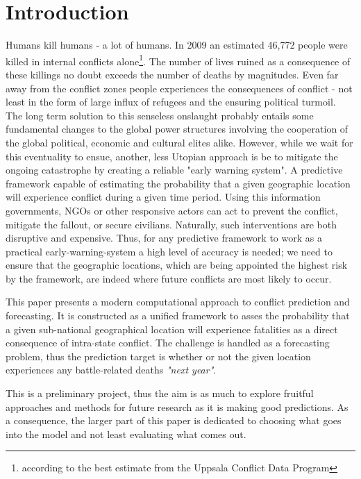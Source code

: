 \documentclass[a4paper]{article}
\begin{document}
\section{Introduction}

Humans kill humans - a lot of humans. In 2009 an estimated 46,772 people were killed in internal conflicts alone\footnote{according to the best estimate from the Uppsala Conflict Data Program}. The number of lives ruined as a consequence of these killings no doubt exceeds the number of deaths by magnitudes. Even far away from the conflict zones people experiences the consequences of conflict - not least in the form of large influx of refugees and the ensuring political turmoil. The long term solution to this senseless onslaught probably entails some fundamental changes to the global power structures involving the cooperation of the global political, economic and cultural elites alike. However, while we wait for this eventuality to ensue, another, less Utopian approach is be to mitigate the ongoing catastrophe by creating a reliable "early warning system". A predictive framework capable of estimating the probability that a given geographic location will experience conflict during a given time period. Using this information governments, NGOs or other responsive actors can act to prevent the conflict, mitigate the fallout, or secure civilians. Naturally, such interventions are both disruptive and expensive. Thus, for any predictive framework to work as a practical early-warning-system a high level of accuracy is needed; we need to ensure that the geographic locations, which are being appointed the highest risk by the framework, are indeed where future conflicts are most likely to occur.\par

This paper presents a modern computational approach to conflict prediction and forecasting. It is constructed as a unified framework to asses the probability that a given sub-national geographical location will experience fatalities as a direct consequence of intra-state conflict. The challenge is handled as a forecasting problem, thus the prediction target is whether or not the given location experiences any battle-related deaths \emph{"next year"}.\par 

This is a preliminary project, thus the aim is as much to explore fruitful approaches and methods for future research as it is making good predictions. As a consequence, the larger part of this paper is dedicated to choosing what goes into the model and not least evaluating what comes out.\par
\end{document}
